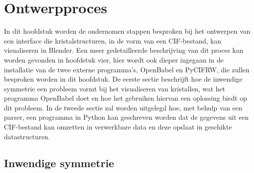 

\chapter{Ontwerpproces}

In dit hoofdstuk worden de ondernomen stappen besproken bij het ontwerpen van een interface die kristalstructuren, in de vorm van een CIF-bestand, kan visualiseren in Blender. Een meer gedetailleerde beschrijving van dit proces kan worden gevonden in hoofdstuk vier, hier wordt ook dieper ingegaan in de installatie van de twee externe programma's, OpenBabel en PyCIFRW, die zullen besproken worden in dit hoofdstuk. De eerste sectie beschrijft hoe de inwendige symmetrie een probleem vormt bij het visualiseren van kristallen, wat het programma OpenBabel doet en hoe het gebruiken hiervan een oplossing biedt op dit probleem.
In de tweede sectie zal worden uitgelegd hoe, met behulp van een parser, een programma in Python kan geschreven worden dat de gegevens uit een CIF-bestand kan omzetten in verwerkbare data en deze opslaat in geschikte datastructuren.


\section{Inwendige symmetrie}

